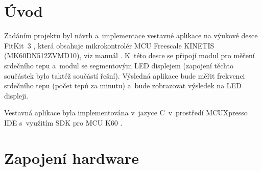 \documentclass[a4paper, 11pt, twocolumn]{article}
\begin{document}



	\section{Úvod}

	Zadáním projektu byl návrh a~implementace vestavné aplikace na výukové
	desce FitKit~3 \cite{fitkit}, která obsahuje mikrokontrolér
	MCU Freescale KINETIS (MK60DN512ZVMD10), viz manuál \cite{k60_manual}.
	K~této desce se připojí modul pro měření srdečního tepu a~modul se
	segmentovým LED displejem (zapojení těchto součástek bylo taktéž
	součástí řešní). Výsledná aplikace bude měřit frekvenci srdečního
	tepu (počet tepů za minutu) a~bude zobrazovat výsledek na LED
	displeji.

	Vestavná aplikace byla implementována v~jazyce C~v~prostředí
	MCUXpresso IDE s~využitím SDK pro MCU K60 \cite{sdk}.



	\section{Zapojení hardware}
\end{document}
